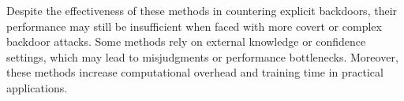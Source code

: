 \documentclass[lettersize,journal]{IEEEtran}
\begin{document}
Despite the effectiveness of these methods in countering explicit backdoors, their performance may still be insufficient when faced with more covert or complex backdoor attacks. Some methods rely on external knowledge or confidence settings, which may lead to misjudgments or performance bottlenecks. Moreover, these methods increase computational overhead and training time in practical applications. %
\end{document}
